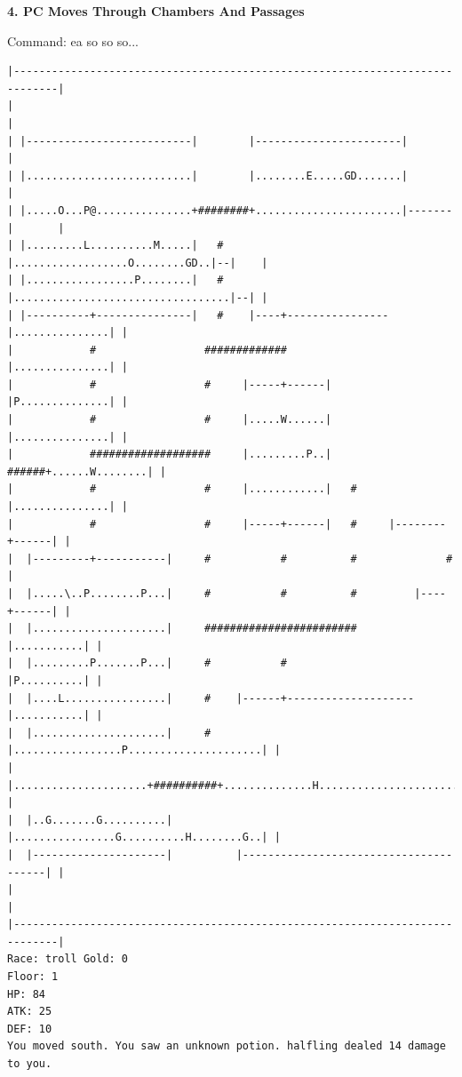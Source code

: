 \documentclass[11pt]{article}
\theoremstyle{plain}
\begin{document}
\newpage
\textbf{4. PC Moves Through Chambers And Passages}

Command: ea so so so...
\begin{Verbatim}[fontsize=\scriptsize]
|-----------------------------------------------------------------------------|
|                                                                             |
| |--------------------------|        |-----------------------|               |
| |..........................|        |........E.....GD.......|               |
| |.....O...P@...............+########+.......................|-------|       |
| |.........L..........M.....|   #    |..................O........GD..|--|    |
| |.................P........|   #    |..................................|--| |
| |----------+---------------|   #    |----+----------------|...............| |
|            #                 #############                |...............| |
|            #                 #     |-----+------|         |P..............| |
|            #                 #     |.....W......|         |...............| |
|            ###################     |.........P..|   ######+......W........| |
|            #                 #     |............|   #     |...............| |
|            #                 #     |-----+------|   #     |--------+------| |
|  |---------+-----------|     #           #          #              #        |
|  |.....\..P........P...|     #           #          #         |----+------| |
|  |.....................|     ########################         |...........| |
|  |.........P.......P...|     #           #                    |P..........| |
|  |....L................|     #    |------+--------------------|...........| |
|  |.....................|     #    |.................P.....................| |
|  |.....................+##########+..............H........................| |
|  |..G.......G..........|          |................G..........H........G..| |
|  |---------------------|          |---------------------------------------| |
|                                                                             |
|-----------------------------------------------------------------------------|
Race: troll Gold: 0                                                    Floor: 1
HP: 84
ATK: 25
DEF: 10
You moved south. You saw an unknown potion. halfling dealed 14 damage to you. 
\end{Verbatim}
\end{document}
